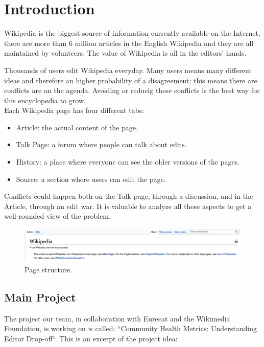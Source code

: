 \chapter{Introduction}
Wikipedia is the biggest source of information currently available on the Internet, there are more
than 6 million articles in the English Wikipedia and they are all maintained by volunteers. The
value of Wikipedia is all in the editors' hands.

Thousands of users edit Wikipedia everyday. Many users means many different ideas and therefore an
higher probability of a disagreement; this means there are conflicts are on the agenda. Avoiding or
reducig these conflicts is the best way for this encyclopedia to grow. \\

Each Wikipedia page has four different tabs:  
\begin{itemize}
    \item Article: the actual content of the page.
    \item Talk Page: a forum where people can talk about edits. 
    \item History: a place where everyone can see the older versions of the pages.
    \item Source: a section where users can edit the page. 
\end{itemize}

Conflicts could happen both on the Talk page, through a discussion, and in the Article, through an
edit war. It is valuable to analyze all these aspects to get a well-rounded view of the problem.

\begin{figure}
    \centering
    \includegraphics[width=1\textwidth]{./chapters/01/assets/wikipedia_page.png}
    \caption{Page structure.}
    \label{fig:page}
\end{figure}

\section{Main Project}
\label{sec:Main Project}
The project our team, in collaboration with Eurecat and the Wikimedia Foundation, is working on
is called: “Community Health Metrics: Understanding Editor Drop-off“. This is an excerpt of the
project idea: \\

